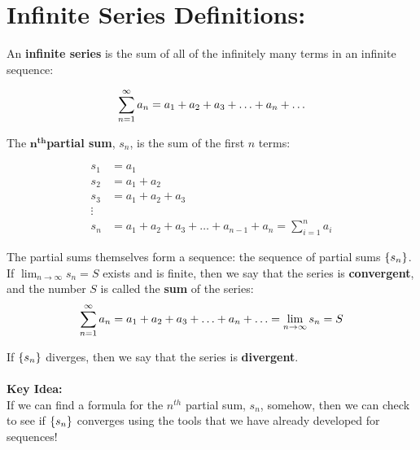 
\setlength{\columnseprule}{.4pt}
\setlength{\columnsep}{3em}



\section*{Infinite Series Definitions: }
An \textbf{infinite series} is the sum of all of the infinitely many terms in an infinite sequence:

\[
\sum_{n=1}^\infty a_n = a_1 + a_2 + a_3 + \ldots + a_n + \ldots
\]

The \(\boldsymbol{n^{th}}\)\textbf{partial sum}, \(s_n\), is the sum of the first \(n\) terms:


\begin{align*}
s_1 &= a_1\\
s_2 &= a_1 + a_2\\
s_3 & = a_1 + a_2 + a_3\\
\vdots &\\
s_n & = a_1 + a_2 + a_3+ \ldots + a_{n-1} + a_n = \sum_{i=1}^{n} a_i
\end{align*}


The partial sums themselves form a sequence: the sequence of partial sums \(\lbrace s_n\rbrace\).\\


If \(\lim_{n\rightarrow\infty} s_n = S\) exists and is finite, then we say that the series is \textbf{convergent}, and the number \(S\) is called the \textbf{sum} of the series:\\

\[
\sum_{n=1}^\infty a_n = a_1 + a_2 + a_3 + \ldots + a_n + \ldots = \lim_{n\rightarrow\infty} s_n =S
\]

If \(\lbrace s_n\rbrace\) diverges, then we say that the series is \textbf{divergent}.\\

~\\

\textbf{Key Idea:}\\
If we can find a formula for the \(n^{th}\) partial sum, \(s_n\), somehow, then we can check to see if \(\lbrace s_n\rbrace\) converges using the tools that we have already developed for sequences!


